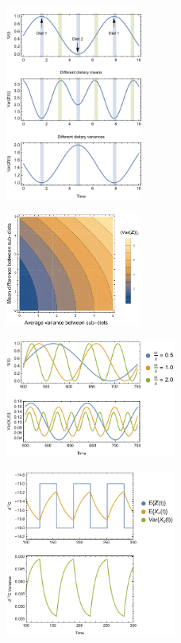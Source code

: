 \documentclass{frontiersSCNS}
\begin{document}
\begin{figure}[h!]
\centering
\includegraphics[width=0.4\textwidth]{fig_varZt.pdf}
\caption{
}
  \label{figvarZt}
\end{figure}

\begin{figure}[h!]
\centering
\includegraphics[width=0.4\textwidth]{fig_varzContour.pdf}
\caption{
}
  \label{figvarcont}
\end{figure}


\begin{figure}[h!]
\centering
\includegraphics[width=0.5\textwidth]{fig_xcsin.pdf}
\caption{
}
  \label{figxcsin}
\end{figure}

\begin{figure}[h!]
\centering
\includegraphics[width=0.5\textwidth]{fig_sawtooth.pdf}
\caption{
}
  \label{figsawtooth}
\end{figure}
\end{document}
